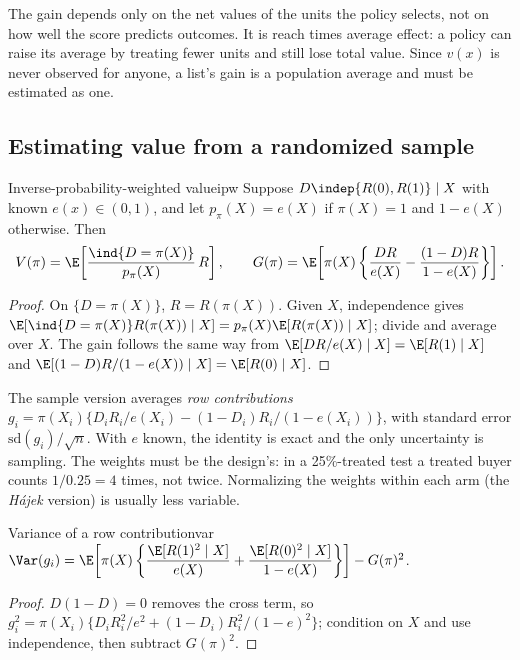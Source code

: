\documentclass[11pt]{article}
\begin{document}
The gain depends only on the net values of the units the policy selects, not on how well the score predicts
outcomes. It is reach times average effect: a policy can raise its average by treating fewer units and still lose
total value. Since $v(x)$ is never observed for anyone, a list's gain is a population average and must be
estimated as one.

\subsection{Estimating value from a randomized sample}

\begin{prop}{Inverse-probability-weighted value}{ipw}
Suppose $D \indep \{R(0), R(1)\} \mid X$ with known $e(x) \in (0,1)$, and let $p_\pi(X) = e(X)$ if $\pi(X) = 1$ and
$1 - e(X)$ otherwise. Then
\[
  V(\pi) = \E\!\left[\frac{\ind{D = \pi(X)}}{p_\pi(X)}\,R\right], \qquad
  G(\pi) = \E\!\left[\pi(X)\left\{\frac{DR}{e(X)} - \frac{(1-D)R}{1-e(X)}\right\}\right].
\]
\end{prop}
\begin{proof}
On $\{D = \pi(X)\}$, $R = R(\pi(X))$. Given $X$, independence gives
$\E[\ind{D = \pi(X)}R(\pi(X)) \mid X] = p_\pi(X)\E[R(\pi(X)) \mid X]$; divide and average over $X$. The gain follows the
same way from $\E[DR/e(X) \mid X] = \E[R(1) \mid X]$ and $\E[(1-D)R/(1-e(X)) \mid X] = \E[R(0) \mid X]$.
\end{proof}

The sample version averages \emph{row contributions}
$g_i = \pi(X_i)\{D_iR_i/e(X_i) - (1-D_i)R_i/(1-e(X_i))\}$, with standard error $\text{sd}(g_i)/\sqrt n$. With $e$ known,
the identity is exact and the only uncertainty is sampling. The weights must be the design's: in a 25\%-treated
test a treated buyer counts $1/0.25 = 4$ times, not twice. Normalizing the weights within each arm (the
\emph{H\'ajek} version) is usually less variable.

\begin{prop}{Variance of a row contribution}{var}
$\Var(g_i) = \E\!\left[\pi(X)\left\{\dfrac{\E[R(1)^2 \mid X]}{e(X)} + \dfrac{\E[R(0)^2 \mid X]}{1-e(X)}\right\}\right] - G(\pi)^2$.
\end{prop}
\begin{proof}
$D(1-D) = 0$ removes the cross term, so $g_i^2 = \pi(X_i)\{D_iR_i^2/e^2 + (1-D_i)R_i^2/(1-e)^2\}$; condition on $X$ and
use independence, then subtract $G(\pi)^2$.
\end{proof}
\end{document}
